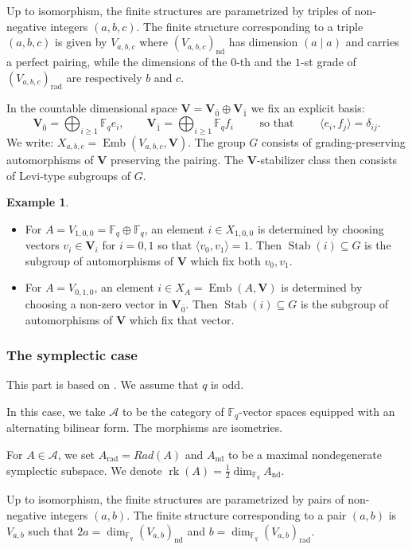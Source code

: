 \documentclass[11pt,a4paper]{amsart}
\theoremstyle{plain}%
\theoremstyle{definition}
\newtheorem{example}[lemma]{Example}
\theoremstyle{remark}
\newcommand{\rk}{{\operatorname{rk}}}
\newcommand{\V}{\mathbf{V}}
\newcommand{\F}{{\mathbb F}}
\newcommand{\Emb}{\operatorname{Emb}}
\newcommand{\Stab}{\operatorname{Stab}}
\begin{document}
Up to isomorphism, the finite structures are parametrized by triples of non-negative integers $(a,b,c)$. The  finite structure corresponding to a triple $(a,b,c)$ is given by $V_{a,b,c}$ where $(V_{a,b,c})_{\mathrm{nd}} $ has dimension $(a\mid a)$ and carries a perfect pairing, while the dimensions of the $0$-th and the $1$-st grade of $(V_{a,b,c})_{\mathrm{rad}}$ are respectively $b$ and $c$.

In the countable dimensional space $\V=\V_{\bar 0}\oplus\V_{\bar 1}$ we fix an explicit basis:
\[
\V_{\bar 0}=\bigoplus_{i\geq1}\F_q e_i,
 \qquad
\V_{\bar 1}=\bigoplus_{i\geq1}\F_q f_i
 \qquad \text{ so that } \qquad
 \langle e_i,f_j\rangle=\delta_{ij}.
\] 
We write: $X_{a,b,c}=\Emb(V_{a,b,c}, \V)$.
The group $G$ consists of grading-preserving automorphisms of $\V$ preserving the pairing. The $\V$-stabilizer class then consists of Levi-type subgroups of $G$. 


\begin{example}
\mbox{}
\begin{itemize}[itemindent=0pt,leftmargin=*]
    \item For $A=V_{1,0,0}=\F_q\oplus \F_q$, an element $i\in X_{1,0,0}$ is determined by choosing {vectors} $v_i\in \V_{i}$ for $i=0,1$ so that $ \langle v_0,v_1\rangle=1$. Then $\Stab(i)\subseteq G$ is the subgroup of automorphisms of $\V$ which fix both $v_0, v_1$.  
\item For $A=V_{0,1,0}$, an element $i\in X_A=\Emb(A, \V)$ is determined by choosing a non-zero vector in $\V_{\bar 0}$. Then $\Stab(i)\subseteq G$ is the subgroup of automorphisms of $\V$ which fix that vector. 
\end{itemize}

\end{example}

\subsubsection{The symplectic case}
This part is based on \cite[\S8.1]{HS-classical}. We assume that $q$ is odd.

In this case, we take $\mathcal{A}$ to be the category of $\F_q$-vector spaces equipped with an alternating bilinear form. The morphisms are isometries.

For $A\in \mathcal{A}$, we set $A_{\mathrm{rad}}=Rad(A)$ and $A_{\mathrm{nd}}$ to be a maximal nondegenerate symplectic subspace. We denote $\rk(A)=\frac{1}{2}\dim_{\F_q} A_{\mathrm{nd}}$.


Up to isomorphism, the finite structures are parametrized by pairs of non-negative integers $(a,b)$. The finite structure corresponding to a pair $(a,b)$ is $V_{a,b}$ such that $2a=\dim_{\F_q} (V_{a,b})_{\mathrm{nd}}$ and $b=\dim_{\F_q} (V_{a,b})_{\mathrm{rad}}$. 
\end{document}
